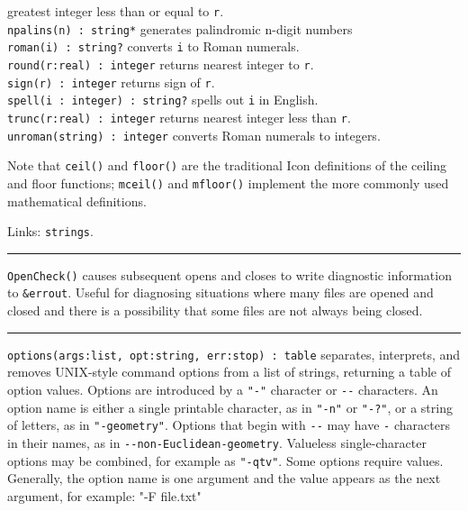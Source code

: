 greatest integer less than or equal to \texttt{r}.\\
\texttt{npalins(n) : string*} generates palindromic n-digit
numbers\\
\texttt{roman(i) : string?} converts \texttt{i} to Roman numerals.\\
\texttt{round(r:real) : integer} returns nearest integer to
\texttt{r}.\\
\texttt{sign(r) : integer} returns sign of \texttt{r}.\\
\texttt{spell(i : integer) : string?} spells out \texttt{i} in
English.\\
\texttt{trunc(r:real) : integer} returns nearest integer less than
\texttt{r}.\\
\texttt{unroman(string) : integer} converts Roman numerals to integers.

Note that \texttt{ceil()} and \texttt{floor()} are the traditional Icon
definitions of the ceiling and floor functions; \texttt{mceil()} and
\texttt{mfloor()} implement the more commonly used mathematical definitions.

Links: \texttt{strings}.

\vspace{0.25cm}\hrule{}

\texttt{OpenCheck()} causes subsequent opens and closes to write
diagnostic information to \texttt{\&errout}. Useful for diagnosing
situations where many files are opened and closed and there is a
possibility that some files are not always being closed.

\vspace{0.25cm}\hrule{}

\texttt{options(args:list, opt:string, err:stop) : table} separates,
interprets, and removes UNIX-style command
options from a list of strings,
returning a table of option values. Options are
introduced by a \texttt{"-"} character or \texttt{-{}-} characters. An
option name is either a single printable character, as in
\texttt{"-n"} or
\texttt{"-?"}, or a string of letters, as
in \texttt{"-geometry"}.
Options that begin with \texttt{-{}-} may have \texttt{-} characters
in their names, as in \texttt{-{}-non-Euclidean-geometry}.
Valueless single-character options may be combined, for example as
\texttt{"-qtv"}. Some options require
values. Generally, the option name is one argument and the value
appears as the next argument, for example: {\ttfamily "-F file.txt"}

